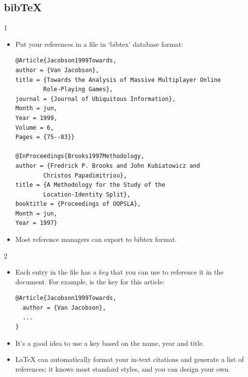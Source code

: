 \documentclass[aspectratio=169]{beamer}
\begin{document}
\subsection{bib\TeX}
\begin{frame}[fragile]{\insertsubsection{} 1}
\begin{itemize}
\item Put your references in a  file in `bibtex' database format:
\begin{lstlisting}
@Article{Jacobson1999Towards,
author = {Van Jacobson},
title = {Towards the Analysis of Massive Multiplayer Online
        Role-Playing Games},
journal = {Journal of Ubiquitous Information},
Month = jun,
Year = 1999,
Volume = 6,
Pages = {75--83}}

@InProceedings{Brooks1997Methodology,
author = {Fredrick P. Brooks and John Kubiatowicz and
        Christos Papadimitriou},
title = {A Methodology for the Study of the
        Location-Identity Split},
booktitle = {Proceedings of OOPSLA},
Month = jun,
Year = 1997}
\end{lstlisting}
\item Most reference managers can export to bibtex format.
\end{itemize}
\end{frame}

\begin{frame}[fragile]{\insertsubsection{} 2}
\begin{itemize}
\item Each entry in the  file has a \emph{key} that you can use to
reference it in the document. For example,  is the key for this article:
\begin{lstlisting}
@Article{Jacobson1999Towards,
  author = {Van Jacobson},
  ...
}
\end{lstlisting}
\item It's a good idea to use a key based on the name, year and title.
\item \LaTeX{} can automatically format your in-text citations and generate a
list of references; it knows most standard styles, and you can design your own.
\end{itemize}
\end{frame}
\end{document}
